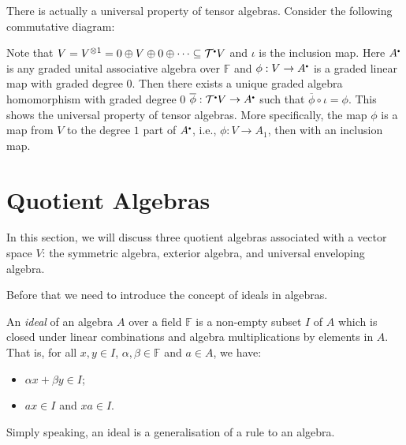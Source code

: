 \documentclass[
	11pt, %
	fleqn, %
	a4paper, %
]{LegrandOrangeBook}
\newcommand{\smallbullet}{\scalebox{0.5}{$\bullet$}}
\renewcommand{\bar}[1]{\overline{#1}} %
\newcommand{\F}{\mathbb{F}} %
\newcommand{\T}{\mathcal{T}^{\smallbullet}} %
\begin{document}
There is actually a universal property of tensor algebras. Consider the following commutative diagram:
\begin{center}
\end{center}
Note that $V = V^{\otimes 1} = 0 \oplus V \oplus 0 \oplus \cdots \subseteq \T V$ and $\iota$ is the inclusion map. Here $A^{\smallbullet}$ is any graded unital associative algebra over $\F$ and $\phi : V \to A^{\smallbullet}$ is a graded linear map with graded degree $0$. Then there exists a unique graded algebra homomorphism with graded degree $0$ $\bar{\phi} : \T V \to A^{\smallbullet}$ such that $\bar{\phi} \circ \iota = \phi$. This shows the universal property of tensor algebras. More specifically, the map $\phi$ is a map from $V$ to the degree $1$ part of $A^{\smallbullet}$, i.e., $\phi : V \to A_1$, then with an inclusion map.

\newpage

\section{Quotient Algebras}

In this section, we will discuss three quotient algebras associated with a vector space $V$: the symmetric algebra, exterior algebra, and universal enveloping algebra.

Before that we need to introduce the concept of ideals in algebras.

\begin{definition}
    An \emph{ideal} of an algebra $A$ over a field $\F$ is a non-empty subset $I$ of $A$ which is closed under linear combinations and algebra multiplications by elements in $A$. That is, for all $x, y \in I$, $\alpha, \beta \in \F$ and $a \in A$, we have:
    \begin{itemize}
        \item $\alpha x + \beta y \in I$;
        \item $ax \in I$ and $xa \in I$.
    \end{itemize}
\end{definition}

Simply speaking, an ideal is a generalisation of a rule to an algebra.
\end{document}

